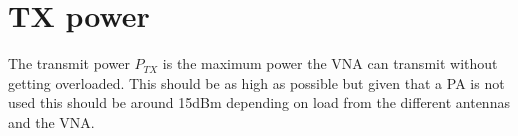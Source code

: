 

\section{TX power}
The transmit power $P_{TX}$ is the maximum power the VNA can transmit without getting overloaded. This should be as high as possible but given that a \gls{PA} is not used this should be around 15dBm \citep{Key_PNA} depending on load from the different antennas and the VNA.

